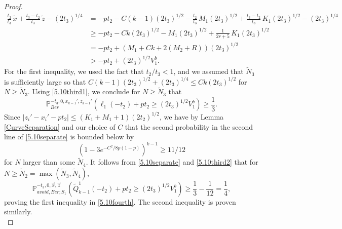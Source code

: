 \begin{proof}
	\begin{align*}
	\frac{t_2}{t_3}\,\tilde{x} + \frac{t_3-t_2}{t_3}\,\tilde{z} - (2t_3)^{1/4} &= -pt_2 - C(k-1)(2t_3)^{1/2} - \frac{t_2}{t_3}\,M_1(2t_3)^{1/2} + \frac{t_3-t_2}{t_3}\,K_1(2t_3)^{1/2} - (2t_3)^{1/4}\\ 
	&\geq -pt_2 - Ck(2t_3)^{1/2} - M_1(2t_3)^{1/2} + \frac{1}{2r+5}\,K_1(2t_3)^{1/2}\\
	&= -pt_2 + (M_1 + Ck + 2(M_2+R))(2t_3)^{1/2}\\
	&> -pt_2 + (2t_3)^{1/2}V_1^b.
	\end{align*}
	For the first inequality, we used the fact that $t_2/t_3 < 1$, and we assumed that $\tilde{N}_3$ is sufficiently large so that $C(k-1)(2t_3)^{1/2} + (2t_3)^{1/4} \leq Ck(2t_3)^{1/2}$ for $N\geq\tilde{N}_3$. Using \eqref{5.10third1}, we conclude for $N\geq\tilde{N}_3$ that
	\begin{equation}\label{5.10third2}
	\mathbb{P}^{-t_3,0,x_{k-1}',z_{k-1}'}_{Ber}\left(\ell_1(-t_2) + pt_2 \geq (2t_3)^{1/2}V_1^b\right) \geq \frac{1}{3}.
	\end{equation}
	Since $|z_i'-x_i'-pt_2| \leq (K_1+M_1+1)(2t_2)^{1/2}$, we have by Lemma \ref{CurveSeparation} and our choice of $C$ that the second probability in the second line of \eqref{5.10separate} is bounded below by
	\[
	\left(1-3e^{-C^2/8p(1-p)}\right)^{k-1} \geq 11/12
	\]
	for $N$ larger than some $\tilde{N}_4$. It follows from \eqref{5.10separate} and \eqref{5.10third2} that for $N\geq\tilde{N}_2 = \max(\tilde{N}_3,\tilde{N}_4)$,
	\begin{equation*}
	\mathbb{P}^{-t_3,0,\vec{x},\vec{z}}_{avoid,Ber;S_1}\left(\tilde{Q}^1_{k-1}(-t_2) + pt_2 \geq (2t_3)^{1/2}V_1^b\right) \geq \frac{1}{3} - \frac{1}{12} = \frac{1}{4},
	\end{equation*}
	proving the first inequality in \eqref{5.10fourth}. The second inequality is proven similarly.
	\\
	

\end{proof}
